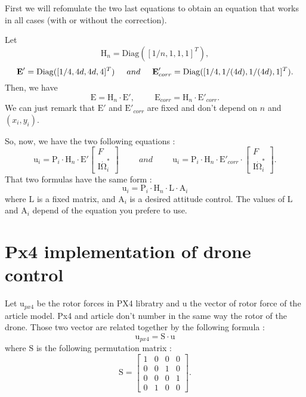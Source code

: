 \documentclass[a4paper]{article}
\newcommand{\UB}[1]{ \bm{\mathrm{#1}} }
\begin{document}
First we will refomulate the two last equations to obtain an equation that works in all cases
(with or without the correction).

Let 
$$
\UB{H}_n = \mathrm{Diag}( [1/n, 1, 1, 1]^T ),
$$
$$
\UB{E}' = \mathrm{Diag}( [1/4, 4d, 4d, 4]^T )
\hspace{.5cm}
and 
\hspace{.5cm}
\UB{E}'_{corr} = \mathrm{Diag}( [1/4, 1/(4d), 1/(4d), 1]^T ).
$$
Then, we have
$$
\UB{E} = \UB{H}_n \cdot \UB{E}',
\hspace{1cm}
\UB{E}_{corr} = \UB{H}_n \cdot \UB{E}'_{corr}.
$$
We can just remark that $\UB{E}'$ and $\UB{E}'_{corr}$ are fixed and don't depend on $n$ and $(x_i,y_i)$.

So, now, we have the two following equations :
$$
\UB{u}_i
=
\UB{P}_i
\cdot
\UB{H}_n
\cdot
\UB{E}'
\left[
    \begin{array}{c}
        F \\
        \UB{I} \dot{\UB{\Omega}}_i^*
    \end{array}
\right]
\hspace{1cm}
and
\hspace{1cm}
\UB{u}_i
=
\UB{P}_i
\cdot
\UB{H}_n
\cdot
\UB{E}'_{corr}
\cdot
\left[
    \begin{array}{c}
        F \\
        \UB{I} \dot{\UB{\Omega}}_i^*
    \end{array}
\right]
.
$$
That two formulas have the same form : 
$$
\UB{u}_i
=
\UB{P}_i
\cdot
\UB{H}_n
\cdot
\UB{L}
\cdot
\UB{A}_{i}
$$
where $\UB{L}$ is a fixed matrix, and $\UB{A}_{i}$ is a desired attitude control.
The values of $\UB{L}$ and $\UB{A}_{i}$ depend of the equation you prefere to use.

\section{Px4 implementation of drone control}

Let $\UB{u}_{px4}$ be the rotor forces in PX4 libratry and 
$\UB{u}$ the vector of rotor force of the article model.
Px4 and article don't number in the same way the rotor of the drone.
Those two vector are related together by the following formula :
$$
\UB{u}_{px4} = \UB{S} \cdot \UB{u}
$$
where $\UB{S}$ is the following permutation matrix : 
$$
\UB{S}=
\left[
\begin{array}{cccc}
1 & 0 & 0 & 0 \\
0 & 0 & 1 & 0 \\
0 & 0 & 0 & 1 \\
0 & 1 & 0 & 0
\end{array}
\right].
$$
\end{document}
